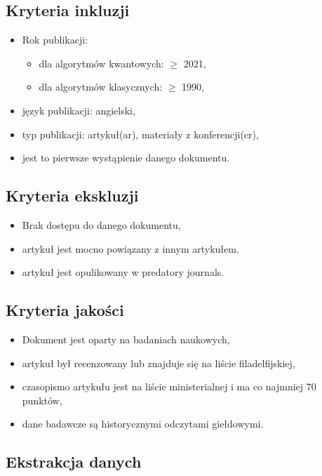 \documentclass[polish,envcountsect,10pt]{article}
\begin{document}
\subsection{Kryteria inkluzji}
\begin{itemize}
	\item Rok publikacji: 
	\begin{itemize}
		\item dla algorytmów kwantowych: $\ge$ 2021,
		\item dla algorytmów klasycznych: $\ge$ 1990,
	\end{itemize}
	\item język publikacji: angielski,
	\item typ publikacji: artykuł(ar), materiały z konferencji(cr),
	\item jest to pierwsze wystąpienie danego dokumentu.
\end{itemize}

\subsection{Kryteria ekskluzji}

\begin{itemize}
	\item Brak dostępu do danego dokumentu,
	\item artykuł jest mocno powiązany z innym artykułem.
	\item artykuł jest opulikowany w predatory journals.
\end{itemize}

\subsection{Kryteria jakości}

\begin{itemize}
	\item Dokument jest oparty na badaniach naukowych,
	\item artykuł był recenzowany lub znajduje się na liście filadelfijskiej,
	\item czasopismo artykułu jest na liście ministerialnej i ma co najmniej 70 punktów,
	\item dane badawcze są historycznymi odczytami giełdowymi.
\end{itemize}

\subsection{Ekstrakcja danych}
\end{document}
